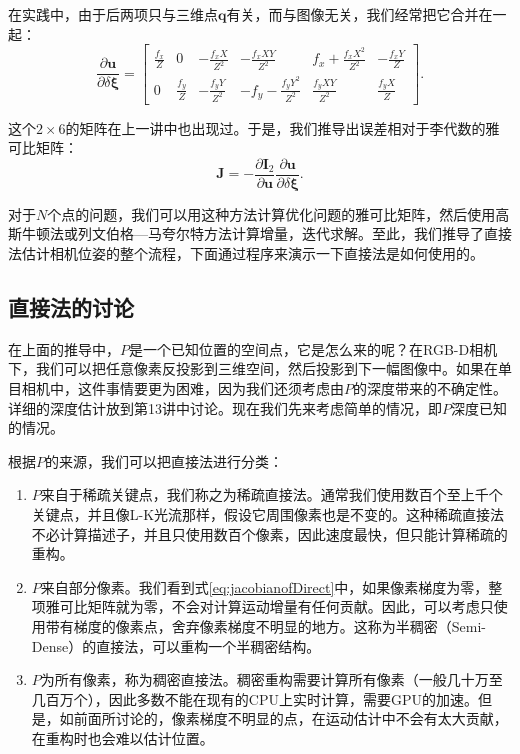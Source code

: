 在实践中，由于后两项只与三维点$\bm{q}$有关，而与图像无关，我们经常把它合并在一起：
\begin{equation}
\frac{{\partial \bm{u}}}{{\partial \delta \bm{\xi} }} = \left[ {\begin{array}{*{20}{c}}
	{\frac{{{f_x}}}{Z}}&0&{ - \frac{{{f_x}X}}{{{Z^2}}}}&{ - \frac{{{f_x}XY}}{{{Z^2}}}}&{{f_x} + \frac{{{f_x}{X^2}}}{{{Z^2}}}}&{ - \frac{{{f_x}Y}}{Z}}\\
	0&{\frac{{{f_y}}}{Z}}&{ - \frac{{{f_y}Y}}{{{Z^2}}}}&{ - {f_y} - \frac{{{f_y}{Y^2}}}{{{Z^2}}}}&{\frac{{{f_y}XY}}{{{Z^2}}}}&{\frac{{{f_y}X}}{Z}}
	\end{array}} \right].
\end{equation}

这个$2 \times 6$的矩阵在上一讲中也出现过。于是，我们推导出误差相对于李代数的雅可比矩阵：
\begin{equation}
\label{eq:jacobianofDirect}
\bm{J} =  - \frac{{\partial { \bm{I}_2}}}{{\partial \bm{u}}}\frac{{\partial \bm{u}}}{{\partial \delta \bm{\xi} }}.
\end{equation}

对于$N$个点的问题，我们可以用这种方法计算优化问题的雅可比矩阵，然后使用高斯牛顿法或列文伯格—马夸尔特方法计算增量，迭代求解。至此，我们推导了直接法估计相机位姿的整个流程，下面通过程序来演示一下直接法是如何使用的。

\subsection{直接法的讨论}
在上面的推导中，$P$是一个已知位置的空间点，它是怎么来的呢？在RGB-D相机下，我们可以把任意像素反投影到三维空间，然后投影到下一幅图像中。如果在单目相机中，这件事情要更为困难，因为我们还须考虑由$P$的深度带来的不确定性。详细的深度估计放到第13讲中讨论。现在我们先来考虑简单的情况，即$P$深度已知的情况。

根据$P$的来源，我们可以把直接法进行分类：
\begin{enumerate}
	\item $P$来自于稀疏关键点，我们称之为稀疏直接法。通常我们使用数百个至上千个关键点，并且像L-K光流那样，假设它周围像素也是不变的。这种稀疏直接法不必计算描述子，并且只使用数百个像素，因此速度最快，但只能计算稀疏的重构。
\clearpage
	\item $P$来自部分像素。我们看到式\eqref{eq:jacobianofDirect}中，如果像素梯度为零，整项雅可比矩阵就为零，不会对计算运动增量有任何贡献。因此，可以考虑只使用带有梯度的像素点，舍弃像素梯度不明显的地方。这称为半稠密（Semi-Dense）的直接法，可以重构一个半稠密结构。
	\item $P$为所有像素，称为稠密直接法。稠密重构需要计算所有像素（一般几十万至几百万个），因此多数不能在现有的CPU上实时计算，需要GPU的加速。但是，如前面所讨论的，像素梯度不明显的点，在运动估计中不会有太大贡献，在重构时也会难以估计位置。
\end{enumerate}

